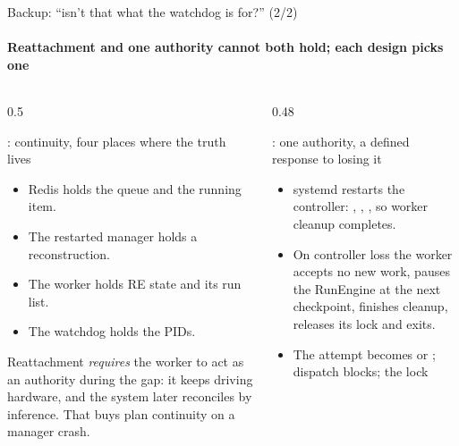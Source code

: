 \begin{frame}{Backup: ``isn't that what the watchdog is for?'' (2/2)}
    \framesubtitle{Reattachment and one authority cannot both hold; each design picks one}
    \begin{columns}[T]
        \begin{column}{0.5\textwidth}
            \begin{alertblock}{\legacy{}: continuity, four places where the truth lives}
                \scriptsize
                \begin{itemize}
                    \item Redis holds the queue and the running item.
                    \item The restarted manager holds a reconstruction.
                    \item The worker holds RE state and its run list.
                    \item The watchdog holds the PIDs.
                \end{itemize}
                \vspace{0.1cm}
                Reattachment \emph{requires} the worker to act as an authority during the gap: it keeps
                driving hardware, and the system later reconciles by inference. That buys plan continuity
                on a manager crash.
            \end{alertblock}
        \end{column}
        \begin{column}{0.48\textwidth}
            \begin{block}{\vtwo{}: one authority, a defined response to losing it}
                \scriptsize
                \begin{itemize}
                    \item systemd restarts the controller: , ,
                          ,  so worker cleanup completes.
                    \item On controller loss the worker accepts no new work, pauses the RunEngine at the next
                          checkpoint, finishes cleanup, releases its lock and exits.
                    \item The attempt becomes  or ; dispatch blocks; the lock

\end{itemize}
\end{block}
\end{column}
\end{columns}
\end{frame}
